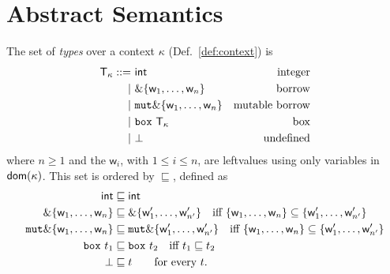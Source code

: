 \section{Abstract Semantics}\label{sec:abstract_semantics}

\begin{definition}[Types]
  The set of \emph{types} over a context $\kappa$ (Def.~\ref{def:context}) is
  \begin{align*}
    \mathsf{T}_\kappa ::=&\ \mathsf{int} & \text{integer}\\
    | &\ \&\{\mathsf{w}_1,\ldots,\mathsf{w}_n\} & \text{borrow}\\
    | &\ \mathtt{mut}\&\{\mathsf{w}_1,\ldots,\mathsf{w}_n\} & \text{mutable borrow}\\
    | &\ \mathtt{box}\ \mathsf{T}_\kappa & \text{box}\\
    | &\ \bot & \text{undefined}
  \end{align*}
  where $n\ge 1$ and the $\mathsf{w}_i$, with $1\le i\le n$, are leftvalues
  using only variables in $\mathsf{dom}(\kappa)$. This set is ordered by $\sqsubseteq$, defined as
  \begin{align*}
    \mathsf{int}&\sqsubseteq\mathsf{int}\\
    \&\{\mathsf{w}_1,\ldots,\mathsf{w}_n\} & \sqsubseteq
    \&\{\mathsf{w}'_1,\ldots,\mathsf{w}'_{n'}\} \quad\text{iff $\{\mathsf{w}_1,\ldots,\mathsf{w}_n\}\subseteq\{\mathsf{w}'_1,\ldots,\mathsf{w}'_{n'}\}$}\\
    \mathtt{mut}\&\{\mathsf{w}_1,\ldots,\mathsf{w}_n\} & \sqsubseteq
    \mathtt{mut}\&\{\mathsf{w}'_1,\ldots,\mathsf{w}'_{n'}\} \quad\text{iff $\{\mathsf{w}_1,\ldots,\mathsf{w}_n\}\subseteq\{\mathsf{w}'_1,\ldots,\mathsf{w}'_{n'}\}$}\\
    \mathtt{box}\ t_1&\sqsubseteq\mathtt{box}\ t_2 \quad\text{iff $t_1\sqsubseteq t_2$}\\
    \bot&\sqsubseteq t\qquad\text{for every $t$.}
  \end{align*}
\end{definition}

